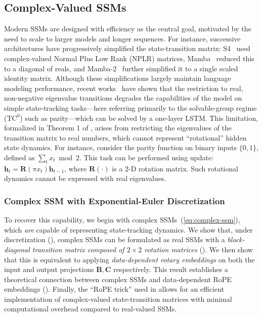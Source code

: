 \documentclass{article}
\newcommand{\citep}{\parencite}
\newcommand{\citet}{\textcite}
\def\plaineqref#1{(\ref{#1})}
\def\vh{{\bm{h}}}
\def\bB{{\bm{B}}}
\def\bC{{\bm{C}}}
\def\bR{{\bm{R}}}
\theoremstyle{plain}
\theoremstyle{definition}
\theoremstyle{remark}
\begin{document}
\subsection{Complex-Valued SSMs}
\label{sec:method:complex}

Modern SSMs are designed with efficiency as the central goal, motivated by the need to scale to larger models and longer sequences.
For instance, successive architectures have progressively simplified the state-transition matrix: S4~\citep{S4} used complex-valued Normal Plus Low Rank (NPLR) matrices, Mamba~\citep{gu2024mambalineartimesequencemodeling} reduced this to a diagonal of reals, and Mamba-2~\citep{dao2024transformersssmsgeneralizedmodels} further simplified it to a single scaled identity matrix.
Although these simplifications largely maintain language modeling performance, recent works~\citep{merrill2025illusionstatestatespacemodels,sarrof2024expressivecapacitystatespace,grazzi2025unlockingstatetrackinglinearrnns} have shown that the restriction to real, non-negative eigenvalue transitions degrades the capabilities of the model on simple state-tracking tasks---here referring primarily to the solvable-group regime ($\text{TC}^0$) such as parity---which can be solved by a one-layer LSTM.
This limitation, formalized in Theorem 1 of \citep{grazzi2024mambacapableincontextlearning}, arises from restricting the eigenvalues of the transition matrix to real numbers, which cannot represent ``rotational'' hidden state dynamics.
For instance, consider the parity function on binary inputs $\{0,1\}$, defined as $\sum_t x_t \bmod 2$.
This task can be performed using update: $\vh_t = \bR(\pi x_t) \vh_{t-1}$, where $\bR(\cdot)$ is a 2-D rotation matrix. 
Such rotational dynamics cannot be expressed with real eigenvalues. 

\subsubsection{Complex SSM with Exponential-Euler Discretization}
To recover this capability, we begin with complex SSMs~\plaineqref{eq:complex-ssm}, which \emph{are} capable of representing state-tracking dynamics. 
We show that, under discretization (), complex SSMs can be formulated as real SSMs with a \emph{block-diagonal transition matrix composed of $2 \times 2$ rotation matrices} (). 
We then show that this is equivalent to applying \emph{data-dependent rotary embeddings} on both the input and output projections $\bB, \bC$ respectively.
This result establishes a theoretical connection between complex SSMs and data-dependent RoPE embeddings ().
Finally, the ``RoPE trick'' used in \citet{su2023roformerenhancedtransformerrotary} allows for an efficient implementation of complex-valued state-transition matrices with minimal computational overhead compared to real-valued SSMs.
\end{document}
